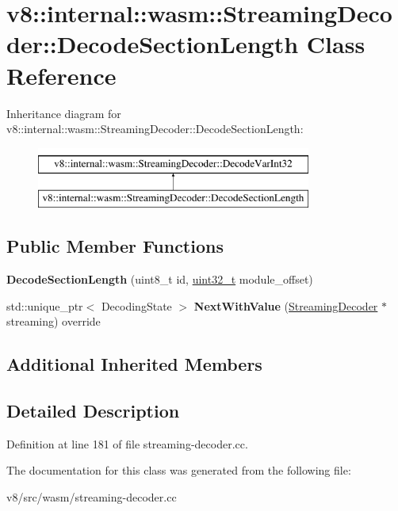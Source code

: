 \hypertarget{classv8_1_1internal_1_1wasm_1_1StreamingDecoder_1_1DecodeSectionLength}{}\section{v8\+:\+:internal\+:\+:wasm\+:\+:Streaming\+Decoder\+:\+:Decode\+Section\+Length Class Reference}
\label{classv8_1_1internal_1_1wasm_1_1StreamingDecoder_1_1DecodeSectionLength}
Inheritance diagram for v8\+:\+:internal\+:\+:wasm\+:\+:Streaming\+Decoder\+:\+:Decode\+Section\+Length\+:\begin{figure}[H]
\begin{center}
\leavevmode
\includegraphics[height=2.000000cm]{classv8_1_1internal_1_1wasm_1_1StreamingDecoder_1_1DecodeSectionLength}
\end{center}
\end{figure}
\subsection*{Public Member Functions}
\begin{DoxyCompactItemize}
\item 
\mbox{\label{classv8_1_1internal_1_1wasm_1_1StreamingDecoder_1_1DecodeSectionLength_ae2104e9da9f2e8d553a210bd4262d5a4}} 
{\bfseries Decode\+Section\+Length} (uint8\+\_\+t id, \mbox{\hyperlink{classuint32__t}{uint32\+\_\+t}} module\+\_\+offset)
\item 
\mbox{\label{classv8_1_1internal_1_1wasm_1_1StreamingDecoder_1_1DecodeSectionLength_a067f3328eaf5c8462c3881ae834d66ce}} 
std\+::unique\+\_\+ptr$<$ Decoding\+State $>$ {\bfseries Next\+With\+Value} (\mbox{\hyperlink{classv8_1_1internal_1_1wasm_1_1StreamingDecoder}{Streaming\+Decoder}} $\ast$streaming) override
\end{DoxyCompactItemize}
\subsection*{Additional Inherited Members}


\subsection{Detailed Description}


Definition at line 181 of file streaming-\/decoder.\+cc.



The documentation for this class was generated from the following file\+:\begin{DoxyCompactItemize}
\item 
v8/src/wasm/streaming-\/decoder.\+cc\end{DoxyCompactItemize}
